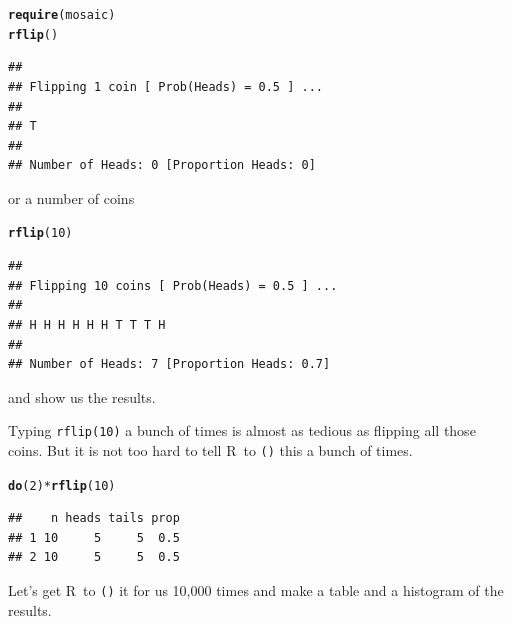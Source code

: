\documentclass[twoside]{book}\usepackage[]{graphicx}\usepackage[]{xcolor}
\makeatletter
\newcommand{\hlnum}[1]{\textcolor[rgb]{0.686,0.059,0.569}{#1}}%
\newcommand{\hlopt}[1]{\textcolor[rgb]{0,0,0}{#1}}%
\newcommand{\hlstd}[1]{\textcolor[rgb]{0.345,0.345,0.345}{#1}}%
\newcommand{\hlkwd}[1]{\textcolor[rgb]{0.737,0.353,0.396}{\textbf{#1}}}%
\newenvironment{kframe}{%
 \def\at@end@of@kframe{}%
 \ifinner\ifhmode%
  \def\at@end@of@kframe{\end{minipage}}%
  \begin{minipage}{\columnwidth}%
 \fi\fi%
 \def\FrameCommand##1{\hskip\@totalleftmargin \hskip-\fboxsep
 \colorbox{shadecolor}{##1}\hskip-\fboxsep
     \hskip-\linewidth \hskip-\@totalleftmargin \hskip\columnwidth}%
 \MakeFramed {\advance\hsize-\width
   \@totalleftmargin\z@ \linewidth\hsize
   \@setminipage}}%
 {\par\unskip\endMakeFramed%
 \at@end@of@kframe}
\newenvironment{knitrout}{}{} %
\newcommand{\Rindex}[1]{\index{\texttt{#1}}}
\newcommand{\function}[1]{{\color{purple!75!blue}\texttt{\StrSubstitute{#1}{()}{}()}}\Rindex{#1}}
\renewcommand{\code}[1]{{\color{blue!80!black}\texttt{#1}}}
\def\R{{\sf R}}
\makeatother
\begin{document}
\begin{knitrout}
\color{fgcolor}\begin{kframe}
\begin{alltt}
\hlkwd{require}\hlstd{(mosaic)}
\hlkwd{rflip}\hlstd{()}
\end{alltt}
\begin{verbatim}
## 
## Flipping 1 coin [ Prob(Heads) = 0.5 ] ...
## 
## T
## 
## Number of Heads: 0 [Proportion Heads: 0]
\end{verbatim}
\end{kframe}
\end{knitrout}
or a number of coins
\begin{knitrout}
\color{fgcolor}\begin{kframe}
\begin{alltt}
\hlkwd{rflip}\hlstd{(}\hlnum{10}\hlstd{)}
\end{alltt}
\begin{verbatim}
## 
## Flipping 10 coins [ Prob(Heads) = 0.5 ] ...
## 
## H H H H H H T T T H
## 
## Number of Heads: 7 [Proportion Heads: 0.7]
\end{verbatim}
\end{kframe}
\end{knitrout}
and show us the results.

Typing \code{rflip(10)} a bunch of times is almost as tedious as 
flipping all those coins.   But it is not too hard to 
tell \R\ to \function{do()} this a bunch of times.
\begin{knitrout}
\color{fgcolor}\begin{kframe}
\begin{alltt}
\hlkwd{do}\hlstd{(}\hlnum{2}\hlstd{)} \hlopt{*} \hlkwd{rflip}\hlstd{(}\hlnum{10}\hlstd{)}
\end{alltt}
\begin{verbatim}
##    n heads tails prop
## 1 10     5     5  0.5
## 2 10     5     5  0.5
\end{verbatim}
\end{kframe}
\end{knitrout}
Let's get \R\ to \function{do()} it for us 10,000 times and make 
a table and a histogram of the results.
\end{document}
